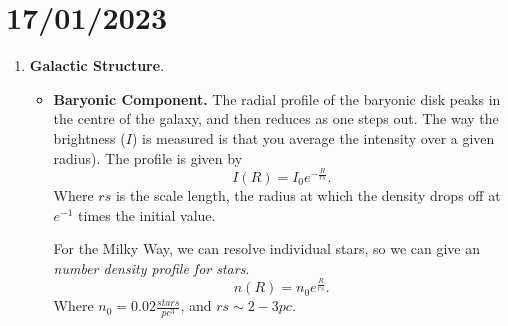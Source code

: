 \documentclass[a4paper]{article}
\begin{document}
\section{17/01/2023}
\begin{enumerate}
	\item {\bf Galactic Structure}. 
		\begin{itemize}
			\item {\bf Baryonic Component.}
				The radial profile of the baryonic disk peaks in the centre of the galaxy, and then reduces as one steps out. The way the brightness ($I $) is measured is that you average the intensity over a given radius). The profile is given by \[
				I(R) = I_{0} e^{-\frac{R}{rs}}
				.\] Where $rs$ is the scale length, the radius at which the density drops off at $e^{-1}$ times the initial value.

				For the Milky Way, we can resolve individual stars, so we can give an {\it number density profile for stars}. \[
				n(R) = n_{0}e^{\frac{R}{rs}}
			.\] Where $n_{0} = 0.02 \frac{stars}{pc^{3}}$, and $rs\sim2-3pc$. 


\end{itemize}
\end{enumerate}
\end{document}
